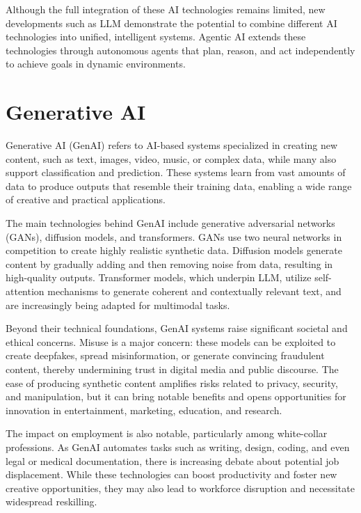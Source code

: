 \documentclass[
  letterpaper,
  DIV=11,
  numbers=noendperiod,
  oneside]{scrreprt}
\begin{document}
\begin{tcolorbox}
Although the full integration of these AI technologies remains limited,
new developments such as LLM demonstrate the potential to combine
different AI technologies into unified, intelligent systems. Agentic AI
extends these technologies through autonomous agents that plan, reason,
and act independently to achieve goals in dynamic environments.

\section{Generative AI}\label{generative-ai}

Generative AI (GenAI){} refers to AI-based systems specialized in
creating new content, such as text, images, video, music, or complex
data, while many also support classification and prediction. These
systems learn from vast amounts of data to produce outputs that resemble
their training data, enabling a wide range of creative and practical
applications.

The main technologies behind GenAI include generative adversarial
networks (GANs), diffusion models, and transformers. GANs use two neural
networks in competition to create highly realistic synthetic data.
Diffusion models generate content by gradually adding and then removing
noise from data, resulting in high-quality outputs. Transformer models,
which underpin LLM, utilize self-attention mechanisms to generate
coherent and contextually relevant text, and are increasingly being
adapted for multimodal tasks.

Beyond their technical foundations, GenAI systems raise significant
societal and ethical concerns. Misuse is a major concern: these models
can be exploited to create deepfakes, spread misinformation, or generate
convincing fraudulent content, thereby undermining trust in digital
media and public discourse. The ease of producing synthetic content
amplifies risks related to privacy, security, and manipulation, but it
can bring notable benefits and opens opportunities for innovation in
entertainment, marketing, education, and research.

The impact on employment is also notable, particularly among
white-collar professions. As GenAI automates tasks such as writing,
design, coding, and even legal or medical documentation, there is
increasing debate about potential job displacement. While these
technologies can boost productivity and foster new creative
opportunities, they may also lead to workforce disruption and
necessitate widespread reskilling.


\end{tcolorbox}
\end{document}
